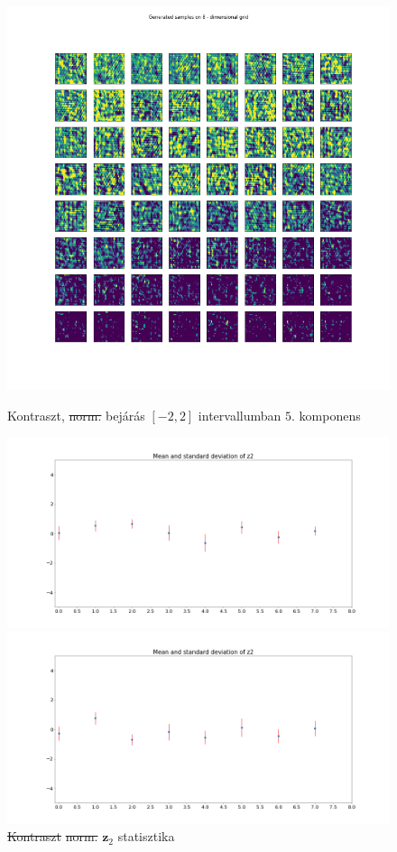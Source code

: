 \documentclass[12pt, english]{article}
\begin{document}
\begin{figure}[H]
\begin{minipage}{0.33\linewidth}
    \label{fig:contrast-no-norm-sweep-3}
  \end{minipage} 
  \begin{minipage}{0.33\linewidth}
    \centering
    \includegraphics[width=.72\linewidth]{sweep/no_norm_contrast_sweep_minus_two_to_two_5th_param.png} 
    \caption{Kontraszt, \st{norm.} \newline bejárás $[-2, 2]$ intervallumban $5.$ komponens} 
    \label{fig:contrast-no-norm-sweep-5}
  \end{minipage}
  \begin{minipage}{0.5\linewidth}
    \centering
    \includegraphics[width=.95\linewidth]{sweep/no_contrast_no_norm_z2_stats.png} 
    \caption{\st{Kontraszt} \newline \st{norm.} $\bm{z}_{2}$ statisztika} 
    \label{fig:no-contrast-no-norm-stats}
  \end{minipage} 
  \begin{minipage}{0.5\linewidth}
    \centering
    \includegraphics[width=.95\linewidth]{sweep/contrast_no_norm_z2_stats.png} 

\end{minipage}
\end{figure}
\end{document}
